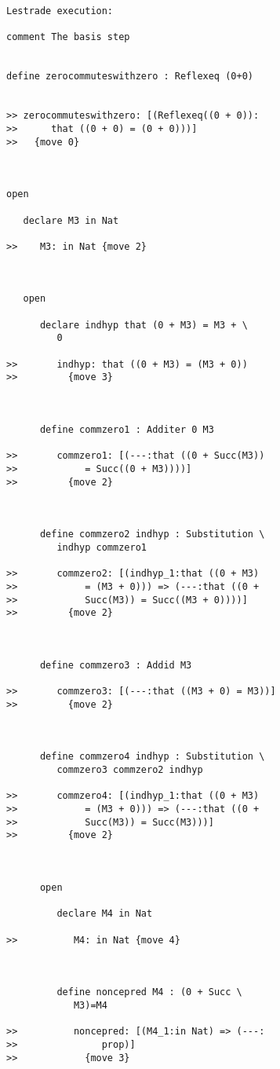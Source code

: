 \documentclass[12pt]{article}
\begin{document}
\begin{verbatim}Lestrade execution:

comment The basis step


define zerocommuteswithzero : Reflexeq (0+0)


>> zerocommuteswithzero: [(Reflexeq((0 + 0)):
>>      that ((0 + 0) = (0 + 0)))]
>>   {move 0}



open

   declare M3 in Nat

>>    M3: in Nat {move 2}



   open

      declare indhyp that (0 + M3) = M3 + \
         0

>>       indhyp: that ((0 + M3) = (M3 + 0))
>>         {move 3}



      define commzero1 : Additer 0 M3

>>       commzero1: [(---:that ((0 + Succ(M3))
>>            = Succ((0 + M3))))]
>>         {move 2}



      define commzero2 indhyp : Substitution \
         indhyp commzero1

>>       commzero2: [(indhyp_1:that ((0 + M3)
>>            = (M3 + 0))) => (---:that ((0 +
>>            Succ(M3)) = Succ((M3 + 0))))]
>>         {move 2}



      define commzero3 : Addid M3

>>       commzero3: [(---:that ((M3 + 0) = M3))]
>>         {move 2}



      define commzero4 indhyp : Substitution \
         commzero3 commzero2 indhyp

>>       commzero4: [(indhyp_1:that ((0 + M3)
>>            = (M3 + 0))) => (---:that ((0 +
>>            Succ(M3)) = Succ(M3)))]
>>         {move 2}



      open

         declare M4 in Nat

>>          M4: in Nat {move 4}



         define noncepred M4 : (0 + Succ \
            M3)=M4

>>          noncepred: [(M4_1:in Nat) => (---:
>>               prop)]
>>            {move 3}




\end{verbatim}
\end{document}
